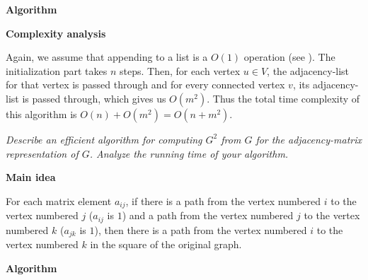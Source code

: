 \textbf{Algorithm}

\begin{algorithm}[H]

\end{algorithm}

\pagebreak
\textbf{Complexity analysis}

Again, we assume that appending to a list is a $O(1)$ operation (see
). The initialization part takes $n$ steps. Then, for each
vertex $u \in V$, the adjacency-list for that vertex is passed through and for
every connected vertex $v$, its adjacency-list is passed through, which gives
us $O(m^{2})$. Thus the total time complexity of this algorithm is $O(n) +
O(m^{2}) = O(n + m^2)$.

\textit{Describe an efficient algorithm for computing $G^{2}$ from $G$ for the
adjacency-matrix representation of $G$. Analyze the running time of your
algorithm.}

\textbf{Main idea}

For each matrix element $a_{ij}$, if there is a path from the vertex numbered
$i$ to the vertex numbered $j$ ($a_{ij}$ is $1$) and a path from the vertex
numbered $j$ to the vertex numbered $k$ ($a_{jk}$ is $1$), then there is a path
from the vertex numbered $i$ to the vertex numbered $k$ in the square of the
original graph.

\textbf{Algorithm}

\begin{algorithm}[H]

\end{algorithm}


